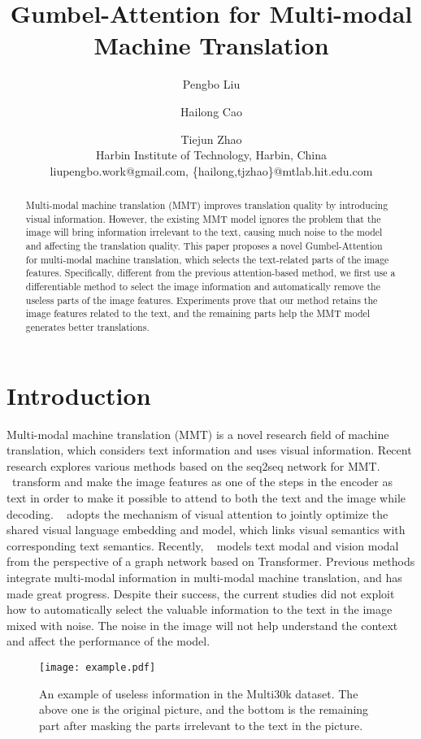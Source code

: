 \documentclass[11pt]{article}
\title{Gumbel-Attention for Multi-modal Machine Translation}
\author{
Pengbo Liu
\and
Hailong Cao\and
Tiejun Zhao \\



Harbin Institute of Technology, Harbin, China\\


liupengbo.work@gmail.com, \{hailong,tjzhao\}@mtlab.hit.edu.com
}
\begin{document}
\maketitle
\begin{abstract}
Multi-modal machine translation (MMT) improves translation quality by introducing visual information. However, the existing MMT model ignores the problem that the image will bring information irrelevant to the text, causing much noise to the model and affecting the translation quality. This paper proposes a novel Gumbel-Attention for multi-modal machine translation, which selects the text-related parts of the image features. Specifically, different from the previous attention-based method, we first use a differentiable method to select the image information and automatically remove the useless parts of the image features. 
Experiments prove that our method retains the image features related to the text, and the remaining parts help the MMT model generates better translations.
\end{abstract}

\section{Introduction}

Multi-modal machine translation (MMT) is a novel research field of machine translation, which considers text information and uses visual information.
Recent research explores various methods based on the seq2seq network for MMT. 
~\citet{DBLP:conf/wmt/HuangLSOD16}transform and make the image features as one of the steps in the encoder as text in order to make it possible to attend to both the text and the image while decoding.
~\citet{DBLP:conf/emnlp/ZhouCLY18} adopts the mechanism of visual attention to jointly optimize the shared visual language embedding and model, which links visual semantics with corresponding text semantics. 
Recently, ~\citet{DBLP:conf/acl/YaoW20} models text modal and vision modal from the perspective of a graph network based on Transformer.
Previous methods integrate multi-modal information in multi-modal machine translation, and has made great progress. 
Despite their success, the current studies did not exploit how to automatically select the valuable information to the text in the image mixed with noise.
The noise in the image will not help understand the context and affect the performance of the model.

\begin{figure}[t]
\centering\texttt{[image: example.pdf]}
	\footnotesize\caption{An example of useless information in the Multi30k dataset. The above one is the original picture, and the bottom is the remaining part after masking the parts irrelevant to the text in the picture.} 
	\label{fig:01}
\end{figure}
\end{document}
